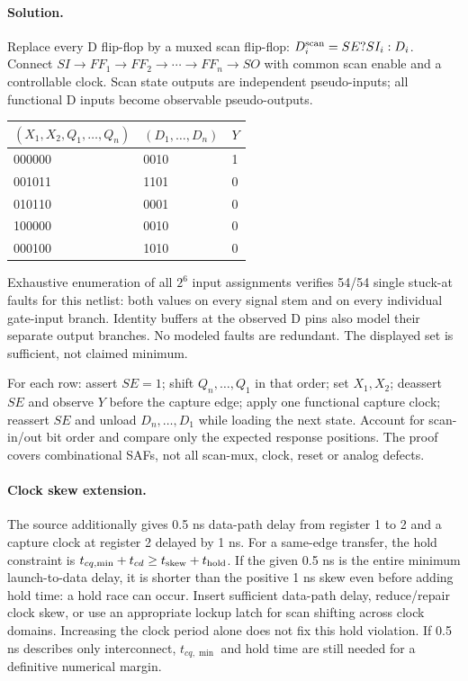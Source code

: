 \documentclass[11pt]{article}
\newcommand{\sol}{\paragraph{Solution.}}
\begin{document}
\sol Replace every D flip-flop by a muxed scan flip-flop:
$D_i^{\rm scan}=SE?SI_i:D_i$.
Connect $SI\to FF_1\to FF_2\to\cdots\to FF_n\to SO$ with common scan enable
and a controllable clock. Scan state outputs are independent pseudo-inputs;
all functional D inputs become observable pseudo-outputs.
\begin{center}\begin{tabular}{lll}\toprule $(X_1,X_2,Q_1,\ldots,Q_n)$ & $(D_1,\ldots,D_n)$ & $Y$\\\midrule
000000 & 0010 & 1\\
001011 & 1101 & 0\\
010110 & 0001 & 0\\
100000 & 0010 & 0\\
000100 & 1010 & 0\\
\bottomrule\end{tabular}\end{center}
Exhaustive enumeration of all $2^{6}$ input assignments verifies
54/54 single stuck-at faults for this netlist:
both values on every signal stem and on every individual gate-input branch.
Identity buffers at the observed D pins also model their separate output branches.
No modeled faults are redundant. The displayed set is sufficient, not claimed minimum.

For each row: assert $SE=1$; shift $Q_n,\ldots,Q_1$ in that order;
set $X_1,X_2$; deassert $SE$ and observe $Y$ before the capture edge;
apply one functional capture clock; reassert $SE$ and unload
$D_n,\ldots,D_1$ while loading the next state.
Account for scan-in/out bit order and compare only the expected response positions.
The proof covers combinational SAFs, not all scan-mux, clock, reset or analog defects.

\paragraph{Clock skew extension.}
The source additionally gives 0.5 ns data-path delay from register 1 to 2 and
a capture clock at register 2 delayed by 1 ns. For a same-edge transfer, the
hold constraint is
$t_{cq,\min}+t_{cd}\ge t_{\rm skew}+t_{\rm hold}$.
If the given 0.5 ns is the entire minimum launch-to-data delay, it is shorter
than the positive 1 ns skew even before adding hold time: a hold race can occur.
Insert sufficient data-path delay, reduce/repair clock skew, or use an
appropriate lockup latch for scan shifting across clock domains.
Increasing the clock period alone does not fix this hold violation.
If 0.5 ns describes only interconnect, $t_{cq,\min}$ and hold time are still
needed for a definitive numerical margin.
\end{document}
